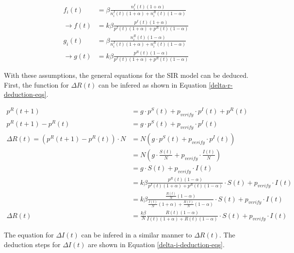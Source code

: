 \begin{subequations}
\begin{align}
    f_i(t) &= \beta \frac{n_i^I(t)(1+\alpha)}{n_i^I(t)(1+\alpha)+n_i^R(t)(1-\alpha)} 
    \nonumber\\
    \to f(t) &= k\beta \frac{p^I(t)(1+\alpha)}{p^I(t)(1+\alpha)+p^R(t)(1-\alpha)}
    \label{generalized-function-f} \\
    g_i(t) &= \beta \frac{n_i^R(t)(1-\alpha)}{n_i^I(t)(1+\alpha)+n_i^R(t)(1-\alpha)} 
    \nonumber \\
    \to g(t) &= k\beta \frac{p^R(t)(1-\alpha)}{p^I(t)(1+\alpha)+p^R(t)(1-\alpha)}
    \label{generalized-function-g}
\end{align}
\label{generalized-functions-g-f}
\end{subequations}

With these assumptions, the general equations for the SIR model can 
be deduced. First, the function for $\Delta R(t)$ can be infered
as shown in Equation \ref{delta-r-deduction-eqs}.

\begin{align}
    p^R(t+1) &= g \cdot p^S(t) + p_{verify}\cdot p^I(t) + p^R(t) \nonumber\\
    p^R(t+1) - p^R(t) &= g \cdot p^S(t) + p_{verify}\cdot p^I(t) \nonumber\\
    \Delta R(t) = (p^R(t+1) - p^R(t))\cdot N 
    &= N(g \cdot p^S(t) + p_{verify}\cdot p^I(t)) \nonumber\\
    &= N(g \cdot \frac{S(t)}{N} + p_{verify}\cdot \frac{I(t)}{N} ) \nonumber\\
    &= g \cdot S(t) + p_{verify}\cdot I(t) \nonumber\\
    &= k\beta \frac{p^R(t)(1-\alpha)}{p^I(t)(1+\alpha)+p^R(t)(1-\alpha)} 
    \cdot S(t) + p_{verify}\cdot I(t) \nonumber\\
    &= k\beta \frac{\frac{R(t)}{N}(1-\alpha)}{\frac{I(t)}{N}(1+\alpha)+\frac{R(t)}{N}(1-\alpha)} 
    \cdot S(t) + p_{verify}\cdot I(t) \nonumber\\
    \Delta R(t) &= \frac{k\beta}{N} \frac{R(t)(1-\alpha)}{I(t)(1+\alpha)+R(t)(1-\alpha)} 
    \cdot S(t) + p_{verify}\cdot I(t) \label{delta-r-deduction-eqs}
\end{align}

The equation for $\Delta I(t)$ can be infered in a similar manner to $\Delta R(t)$.
The deduction steps for $\Delta I(t)$ are shown in Equation 
\ref{delta-i-deduction-eqs}.

